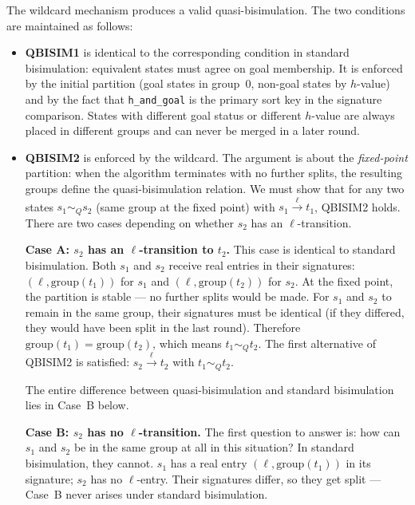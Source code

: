 \documentclass[11pt,a4paper]{article}
\begin{document}
The wildcard mechanism produces a valid quasi-bisimulation.  The two conditions
are maintained as follows:
\begin{itemize}
  \item \textbf{QBISIM1} is identical to the corresponding condition in
    standard bisimulation: equivalent states must agree on goal membership.
    It is enforced by the initial partition (goal states in group~0, non-goal
    states by $h$-value) and by the fact that \texttt{h\_and\_goal} is the
    primary sort key in the signature comparison.  States with different goal
    status or different $h$-value are always placed in different groups and
    can never be merged in a later round.
  \item \textbf{QBISIM2} is enforced by the wildcard.  The argument is about
    the \emph{fixed-point} partition: when the algorithm terminates with no
    further splits, the resulting groups define the quasi-bisimulation relation.
    We must show that for any two states $s_1 \sim_Q s_2$ (same group at the
    fixed point) with $s_1 \xrightarrow{\ell} t_1$, QBISIM2 holds.  There are
    two cases depending on whether $s_2$ has an $\ell$-transition.

    \textbf{Case A: $s_2$ has an $\ell$-transition to $t_2$.}
    This case is identical to standard bisimulation.  Both $s_1$ and $s_2$
    receive real entries in their signatures: $({\ell}, \mathrm{group}(t_1))$
    for $s_1$ and $(\ell, \mathrm{group}(t_2))$ for $s_2$.  At the fixed
    point, the partition is stable --- no further splits would be made.  For
    $s_1$ and $s_2$ to remain in the same group, their signatures must be
    identical (if they differed, they would have been split in the last round).
    Therefore $\mathrm{group}(t_1) = \mathrm{group}(t_2)$, which means
    $t_1 \sim_Q t_2$.  The first alternative of QBISIM2 is satisfied:
    $s_2 \xrightarrow{\ell} t_2$ with $t_1 \sim_Q t_2$. \checkmark

    The entire difference between quasi-bisimulation and standard bisimulation
    lies in Case~B below.

    \textbf{Case B: $s_2$ has no $\ell$-transition.}
    The first question to answer is: how can $s_1$ and $s_2$ be in the same
    group at all in this situation?  In standard bisimulation, they cannot.
    $s_1$ has a real entry $(\ell, \mathrm{group}(t_1))$ in its signature;
    $s_2$ has no $\ell$-entry.  Their signatures differ, so they get split
    --- Case~B never arises under standard bisimulation.


\end{itemize}
\end{document}
